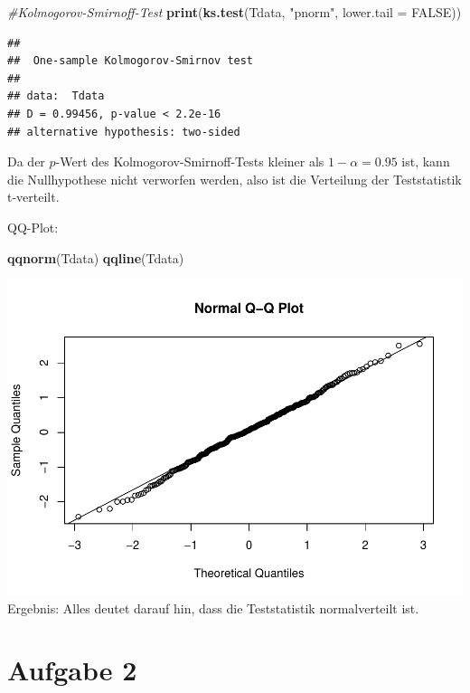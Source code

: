 \documentclass[]{article}
\newenvironment{Shaded}{\begin{snugshade}}{\end{snugshade}}
\newcommand{\CommentTok}[1]{\textcolor[rgb]{0.56,0.35,0.01}{\textit{#1}}}
\newcommand{\DataTypeTok}[1]{\textcolor[rgb]{0.13,0.29,0.53}{#1}}
\newcommand{\KeywordTok}[1]{\textcolor[rgb]{0.13,0.29,0.53}{\textbf{#1}}}
\newcommand{\NormalTok}[1]{#1}
\newcommand{\OtherTok}[1]{\textcolor[rgb]{0.56,0.35,0.01}{#1}}
\newcommand{\StringTok}[1]{\textcolor[rgb]{0.31,0.60,0.02}{#1}}
\begin{document}
\begin{Shaded}
\begin{Highlighting}[]
\CommentTok{#Kolmogorov-Smirnoff-Test}
\KeywordTok{print}\NormalTok{(}\KeywordTok{ks.test}\NormalTok{(Tdata, }\StringTok{"pnorm"}\NormalTok{, }\DataTypeTok{lower.tail =} \OtherTok{FALSE}\NormalTok{))}
\end{Highlighting}
\end{Shaded}

\begin{verbatim}
## 
##  One-sample Kolmogorov-Smirnov test
## 
## data:  Tdata
## D = 0.99456, p-value < 2.2e-16
## alternative hypothesis: two-sided
\end{verbatim}

Da der \(p\)-Wert des Kolmogorov-Smirnoff-Tests kleiner als \(1-\alpha=0.95\) ist, kann die Nullhypothese nicht verworfen werden,
also ist die Verteilung der Teststatistik t-verteilt.

QQ-Plot:

\begin{Shaded}
\begin{Highlighting}[]
\KeywordTok{qqnorm}\NormalTok{(Tdata)}
\KeywordTok{qqline}\NormalTok{(Tdata)}
\end{Highlighting}
\end{Shaded}

\includegraphics{Test_files/figure-latex/unnamed-chunk-9-1.pdf}
Ergebnis: Alles deutet darauf hin, dass die Teststatistik normalverteilt ist.

\hypertarget{aufgabe-2}{%
\section{Aufgabe 2}\label{aufgabe-2}}
\end{document}
